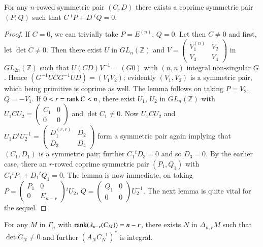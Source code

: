 \setcounter{sublemma}{12}
\begin{sublemma}\label{c1:lem-1.6.13}
For any $n$-rowed symmetric pair $(C,D)$ there exists a coprime
symmetric pair $(P,Q)$ such that $C \; {}^{t}P+D \; {}^{t}Q=0$.
\end{sublemma}

\begin{proof}
If $C=0$, we can trivially take $P=E^{(n)}$, $Q=0$. Let then $C\neq 0$
and first, let $\det C\neq 0$. Then there exist $U$ in
$GL_{n}(\mathbb{Z})$ and $V=\left(\begin{smallmatrix} V^{(n)}_{1} &
  V_{2}\\ V_{3} & V_{4}\end{smallmatrix}\right)$ in
$GL_{2n}(\mathbb{Z})$ such that $U(CD)V^{-1}=(G0)$ with $(n,n)$
integral non-singular $G$. Hence $(G^{-1}UCG^{-1}UD)=(V_{1}V_{2})$;
evidently $(V_{1},V_{2})$ is a symmetric pair, which being primitive
is coprime as well. The lemma follows on taking $P=V_{2}$,
$Q=-V_{1}$. If $0<r=\operatorname{rank} C<n$, there exist $U_{1}$, $U_{2}$ in
$GL_{n}(\mathbb{Z})$ with $U_{1}CU_{2}=\left(\begin{smallmatrix} C_{1}
  & 0\\ 0 & 0\end{smallmatrix}\right)$ and $\det C_{1}\neq 0$. Now
  $U_{1}CU_{2}$ and $U_{1}D{}^{t}U^{-1}_{2}=\left(\begin{smallmatrix}
    D_{1}^{(r,r)} & D_{2}\\ D_{3} & D_{4}
  \end{smallmatrix}\right)$ form a symmetric pair again implying that
  $(C_{1},D_{1})$ is a symmetric pair; further $C_{1}{}^{t}D_{3}=0$
  and so $D_{3}=0$. By the earlier case, there an $r$-rowed coprime
  symmetric pair $(P_{1},Q_{1})$ with
  $C_{1}{}^{t}P_{1}+D_{1}{}^{t}Q_{1}=0$. The lemma is now immediate,
  on taking $P=\left(\begin{smallmatrix} P_{1} & 0\\ 0 & E_{n-r}
  \end{smallmatrix}\right){}^{t}U_{2}$, $Q=\left(\begin{smallmatrix}
    Q_{1} & 0\\ 0 & 0  \end{smallmatrix}\right)U^{-1}_{2}$. The next
  lemma is quite vital for the sequel.
\end{proof}

\begin{sublemma}\label{c1:lem-1.6.14}
For any $M$ in $\Gamma_{n}$ with $\operatorname{rank} (\lambda_{n-r}(C_{M}))=n-r$,
there exists $N$ in $\Delta_{n,r}M$ such that $\det C_{N}\neq 0$ and
further $(A_{N}C^{-1}_{N})^{\ast}$ is integral. 
\end{sublemma}

